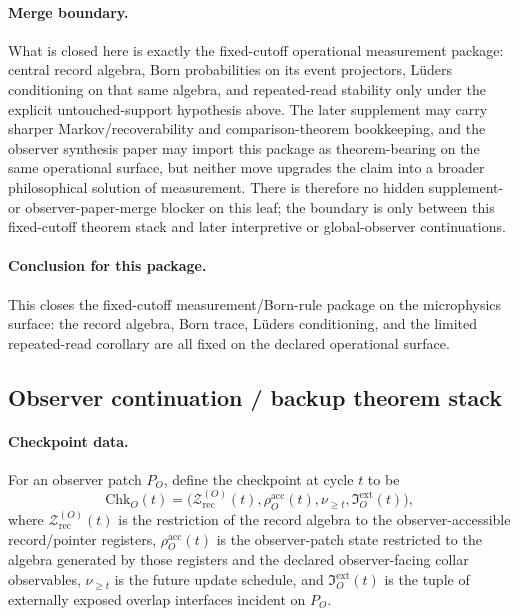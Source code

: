 \documentclass[11pt]{article}
\begin{document}
\paragraph{Merge boundary.}
What is closed here is exactly the fixed-cutoff operational measurement package: central record
algebra, Born probabilities on its event projectors, L\"uders conditioning on that same algebra,
and repeated-read stability only under the explicit untouched-support hypothesis above. The
later supplement may carry sharper Markov/recoverability and comparison-theorem bookkeeping, and
the observer synthesis paper may import this package as theorem-bearing on the same operational
surface, but neither move upgrades the claim into a broader philosophical solution of
measurement. There is therefore no hidden supplement- or observer-paper-merge blocker on this
leaf; the boundary is only between this fixed-cutoff theorem stack and later interpretive or
global-observer continuations.

\paragraph{Conclusion for this package.}
This closes the fixed-cutoff measurement/Born-rule package on the microphysics surface: the
record algebra, Born trace, L\"uders conditioning, and the limited repeated-read corollary are
all fixed on the declared operational surface.

\subsection{Observer continuation / backup theorem stack}

\paragraph{Checkpoint data.}
For an observer patch $P_O$, define the checkpoint at cycle $t$ to be
\begin{equation}
\mathrm{Chk}_O(t)
=
\bigl(
\mathcal Z_{\mathrm{rec}}^{(O)}(t),
\rho_O^{\mathrm{acc}}(t),
\nu_{\ge t},
\mathfrak I_O^{\mathrm{ext}}(t)
\bigr),
\end{equation}
where $\mathcal Z_{\mathrm{rec}}^{(O)}(t)$ is the restriction of the record algebra to the
observer-accessible record/pointer registers, $\rho_O^{\mathrm{acc}}(t)$ is the observer-patch
state restricted to the algebra generated by those registers and the declared observer-facing
collar observables, $\nu_{\ge t}$ is the future update schedule, and
$\mathfrak I_O^{\mathrm{ext}}(t)$ is the tuple of externally exposed overlap interfaces incident
on $P_O$.
\end{document}

